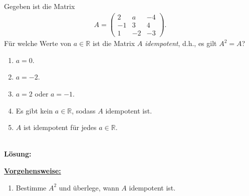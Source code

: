\subsection*{}
Gegeben ist die Matrix
\begin{align*}
	A
	=
	\begin{pmatrix}
		2 & a & -4 \\
		-1 & 3 & 4\\
		1 & -2 & -3
	\end{pmatrix}.
\end{align*}
Für welche Werte von $ a \in \mathbb{R} $ ist die Matrix $ A $
\textit{idempotent}, d.h., es gilt $ A^2 = A $?
\renewcommand{\labelenumi}{(\alph{enumi})}
\begin{enumerate}
	\item 
	$ a= 0 $.
	\item 
	$ a= -2 $.
	\item
	$ a= 2 $ oder $ a= -1 $.
	\item
	Es gibt kein $ a \in \mathbb{R} $, sodass $ A $ idempotent ist.
	\item
	$ A $ ist idempotent für jedes $ a \in \mathbb{R} $.
\end{enumerate}
\ \\
\textbf{Lösung:}
\begin{mdframed}
\underline{\textbf{Vorgehensweise:}}
\renewcommand{\labelenumi}{\theenumi.}
\begin{enumerate}
\item Bestimme $ A^2 $ und überlege, wann $ A $ idempotent ist.
\end{enumerate}
\end{mdframed}

